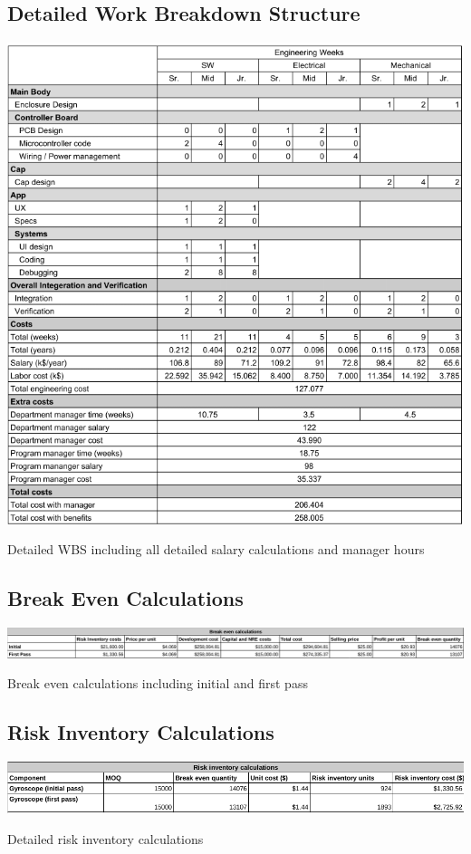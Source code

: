 \documentclass[12pt]{article}
\begin{document}
			\subsection*{Detailed Work Breakdown Structure}
	\begin{table}[H]
		\centering
		\includegraphics[width=\textwidth]{wbs_large3.png}
		\caption{ Detailed WBS including all detailed salary calculations and manager hours}
	\end{table}
		\subsection*{Break Even Calculations}
				\begin{table}[H]
			\includegraphics[width=\textwidth]{breakeven.png}
			
			\caption{ Break even calculations including initial and first pass
}
		\end{table}
		\subsection*{Risk Inventory Calculations}
				\begin{table}[H]
			\includegraphics[width=\textwidth]{risk.png}
			\caption{Detailed risk inventory calculations}
		\end{table}
		
\end{document}

